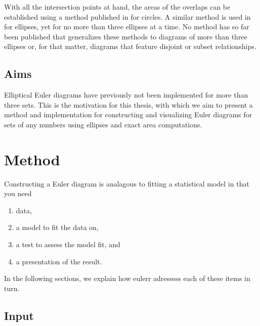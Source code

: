 \documentclass[
  a4paper,
  nofonts,
  nobib,
  nohyper,
  openany
]{tufte-book}\usepackage[]{graphicx}\usepackage[]{color}
\newcommand{\pkg}[1]{{\fontseries{b}\selectfont #1}}
\begin{document}
With all the intersection points at hand, the areas of the overlaps can be established using a method published in \citet{frederickson2014} for circles. A similar method is used in \citet{micallef_2013} for ellipses, yet for no more than three ellipses at a time. No method has so far been published that generalizes these methods to diagrams of more than three ellipses or, for that matter, diagrams that feature disjoint or subset relationships.

\section{Aims}
\label{sec:aims}

Elliptical Euler diagrams have previously not been implemented for more than three sets. This is the motivation for this thesis, with which we aim to present a method and implementation for constructing and visualizing Euler diagrams for sets of any numbers using ellipses and exact area computations.

\chapter{Method}
\label{ch:method}

Constructing a Euler diagram is analagous to fitting a statistical model in that you need
\begin{enumerate}
\item data,
\item a model to fit the data on,
\item a test to assess the model fit, and
\item a presentation of the result.
\end{enumerate}
In the following sections, we explain how \pkg{eulerr} adressess each of these items in turn.

\section{Input}
\label{sec:input}
\end{document}
